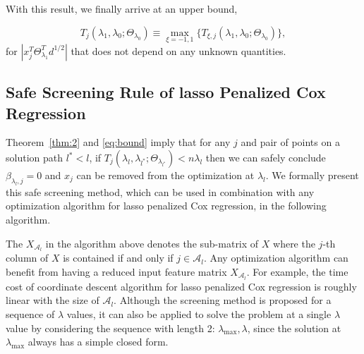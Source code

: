 With this result, we finally arrive at an upper bound,

\begin{equation}
    \label{eq:bound}
    T_j(\lambda_1,\lambda_0;\Theta_{\lambda_0})\equiv\max_{\xi=-1,1}\{T_{\xi,j}(\lambda_1,\lambda_0;\Theta_{\lambda_0})\},
\end{equation}
for $|x_j^T\Theta^T_{\lambda_1}d^{1/2}|$ that does not depend on any unknown quantities. 

\subsection{Safe Screening Rule of lasso Penalized Cox Regression}

Theorem~\ref{thm:2} and \eqref{eq:bound} imply that for any $j$ and pair of points on a solution path $l^*<l$, if $T_j(\lambda_{l},\lambda_{l^*};\Theta_{\lambda_{l^*}})<n\lambda_l$ then we can safely conclude $\beta_{\lambda_l,j}=0$ and $x_j$ can be removed from the optimization at $\lambda_l$. We formally present this safe screening method, which can be used in combination with any optimization algorithm for lasso penalized Cox regression, in the following algorithm.

\begin{algorithm}[H]

    
\end{algorithm}

The $X_{\mathcal{A}_l}$ in the algorithm above denotes the sub-matrix of $X$ where the $j$-th column of $X$ is contained if and only if $j\in{\mathcal{A}_l}$. Any optimization algorithm can benefit from having a reduced input feature matrix $X_{\mathcal{A}_l}$. For example, the time cost of coordinate descent algorithm for lasso penalized Cox regression \citep{simon2011regularization} is roughly linear with the size of $\mathcal{A}_l$. Although the screening method is proposed for a sequence of $\lambda$ values, it can also be applied to solve the problem at a single $\lambda$ value by considering the sequence with length 2: $\lambda_{\max},\lambda$, since the solution at $\lambda_{\max}$ always has a simple closed form.


